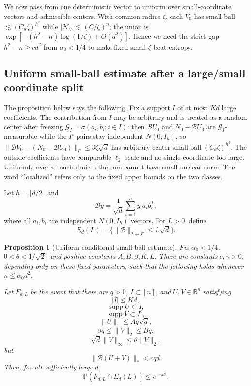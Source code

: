 \documentclass[11pt]{article}
\numberwithin{equation}{section}
\newtheorem{proposition}[theorem]{Proposition}
\theoremstyle{definition}
\theoremstyle{remark}
\newcommand{\R}{\mathbb R}
\newcommand{\Pp}{\mathbb P}
\newcommand{\1}{\boldsymbol 1}
\newcommand{\cB}{\mathcal B}
\newcommand{\supp}{\operatorname{supp}}
\begin{document}
\begin{aiblock}
We now pass from one deterministic vector
to uniform over small-coordinate vectors and
admissible centers. With common radius
$\zeta$, each $V_0$ has small-ball
$\lesssim(C_\theta\zeta)^{h^2}$ while
$|\mathcal N_V|\lesssim(C/\zeta)^n$; the
union is
$\exp[-(h^2-n)\log(1/\zeta)+O(d^2)]$. Hence
we need the strict gap $h^2-n\ge cd^2$ from
$\alpha_0<1/4$ to make fixed small $\zeta$
beat entropy.

\subsection{Uniform small-ball estimate after a
  large/small coordinate split}

The proposition below says the following. Fix a
support $I$ of at most $Kd$ large coefficients.
The contribution from $I$ may be arbitrary and
is treated as a random center after freezing
$\mathcal G_I=\sigma(a_i,b_i:i\in I)$: then
$\mathcal B U_0$ and $N_0-\mathcal B U_0$ are
$\mathcal G_I$-measurable while the $I^c$
pairs stay independent $N(0,I_h)$, so
$\|\mathcal B V_0-(N_0-\mathcal B U_0)\|_F
\le3\zeta\sqrt d$ has arbitrary-center
small-ball $(C_\theta\zeta)^{h^2}$. The
outside coefficients have comparable $\ell_2$
scale and no single coordinate too large.
Uniformly over all such choices the sum
cannot have small nuclear norm. The word
``localized'' refers only to the fixed upper
bounds on the two classes.


Let $h=\lfloor d/2\rfloor$ and
\[
  \cB y=\frac1{\sqrt d}\sum_{i=1}^ny_ia_ib_i^T,
\]
where all $a_i,b_i$ are independent $N(0,I_h)$ vectors.
For $L>0$, define
\[
  E_d(L)=\{\|\cB\|_{2\to F}\le L\sqrt d\}.
\]

\begin{proposition}[Uniform conditional small-ball
  estimate]
  \label{main-proposition-5-1}
  Fix $\alpha_0<1/4$, $0<\theta<1/\sqrt2$, and positive
  constants $A,B,\beta,K,L$. There are constants
  $c,\gamma>0$, depending only on these fixed parameters,
  such that the following holds whenever
  $n\le\alpha_0d^2$.

  Let $F_{d,L}$ be the event that there are $q>0$,
  $I\subset[n]$, and $U,V\in\R^n$ satisfying
  \[
    |I|\le Kd,
  \]
  \[
    \supp U\subset I,
  \]
  \[
    \supp V\subset I^c,
  \]
  \[
    \|U\|_1\le Aq\sqrt d,
  \]
  \[
    \beta q\le\|V\|_2\le Bq,
  \]
  \[
    \sqrt d\|V\|_\infty\le\theta\|V\|_2,
  \]
  but
  \[
    \|\cB(U+V)\|_*<cqd.
  \]
  Then, for all sufficiently large $d$,
  \[
    \Pp(F_{d,L}\cap E_d(L))\le e^{-\gamma d^2}.
  \]
\end{proposition}


\end{aiblock}
\end{document}
